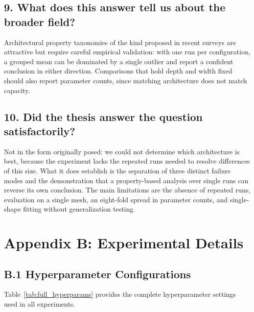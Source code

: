 \subsection*{9. What does this answer tell us about the broader field?}
Architectural property taxonomies of the kind proposed in recent surveys are attractive but require careful empirical validation: with one run per configuration, a grouped mean can be dominated by a single outlier and report a confident conclusion in either direction. Comparisons that hold depth and width fixed should also report parameter counts, since matching architecture does not match capacity.

\subsection*{10. Did the thesis answer the question satisfactorily?}
Not in the form originally posed: we could not determine which architecture is best, because the experiment lacks the repeated runs needed to resolve differences of this size. What it does establish is the separation of three distinct failure modes and the demonstration that a property-based analysis over single runs can reverse its own conclusion. The main limitations are the absence of repeated runs, evaluation on a single mesh, an eight-fold spread in parameter counts, and single-shape fitting without generalization testing.

\newpage

\section*{Appendix B: Experimental Details}

\subsection*{B.1 Hyperparameter Configurations}

Table~\ref{tab:full_hyperparams} provides the complete hyperparameter settings used in all experiments.


